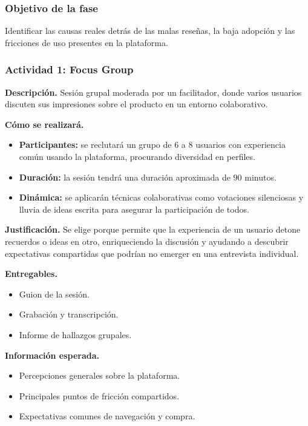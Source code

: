 \documentclass[12pt,letterpaper]{article}
\begin{document}
\subsubsection{Objetivo de la fase}
Identificar las causas reales detrás de las malas reseñas, la baja adopción y las fricciones de uso presentes en la plataforma.

\subsubsection{Actividad 1: Focus Group}

\textbf{Descripción.} Sesión grupal moderada por un facilitador, donde varios usuarios discuten sus impresiones sobre el producto en un entorno colaborativo.

\textbf{Cómo se realizará.}
\begin{itemize}
    \item \textbf{Participantes:} se reclutará un grupo de 6 a 8 usuarios con experiencia común usando la plataforma, procurando diversidad en perfiles.
    \item \textbf{Duración:} la sesión tendrá una duración aproximada de 90 minutos.
    \item \textbf{Dinámica:} se aplicarán técnicas colaborativas como votaciones silenciosas y lluvia de ideas escrita para asegurar la participación de todos.
\end{itemize}

\textbf{Justificación.} Se elige porque permite que la experiencia de un usuario detone recuerdos o ideas en otro, enriqueciendo la discusión y ayudando a descubrir expectativas compartidas que podrían no emerger en una entrevista individual.

\textbf{Entregables.}
\begin{itemize}
    \item Guion de la sesión.
    \item Grabación y transcripción.
    \item Informe de hallazgos grupales.
\end{itemize}

\textbf{Información esperada.}
\begin{itemize}
    \item Percepciones generales sobre la plataforma.
    \item Principales puntos de fricción compartidos.
    \item Expectativas comunes de navegación y compra.
\end{itemize}
\end{document}
